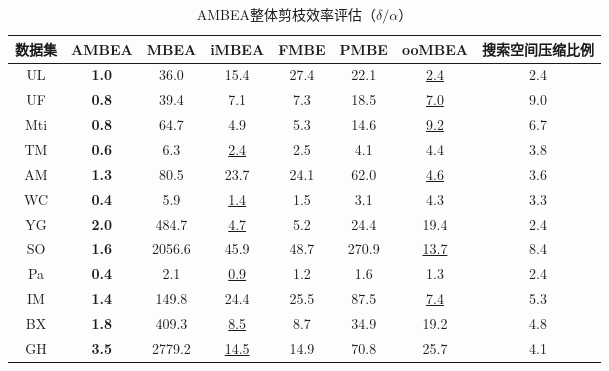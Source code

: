 \begin{table} [H]
	\centering    
	\setlength{\abovecaptionskip}{0cm}  
  \setlength{\belowcaptionskip}{-0.1cm}
	\caption{AMBEA整体剪枝效率评估（$\delta/\alpha$）}      
	\label{tbl:ambea_prune}
	\setlength{\tabcolsep}{5pt}
	\begin{center}
				\normalsize{
		\begin{tabular}{cccccccc}
			\hline 

      \textbf{数据集} & \textbf{AMBEA} & \textbf{MBEA} & \textbf{iMBEA} & \textbf{FMBE} & \textbf{PMBE} & \textbf{ooMBEA} & \textbf{搜索空间压缩比例} \\ \hline
      UL & \textbf{1.0} & 36.0 & 15.4 & 27.4 & 22.1 & \uline{2.4} & 2.4\\
      UF & \textbf{0.8} & 39.4 & 7.1 & 7.3 & 18.5 & \uline{7.0} & 9.0\\
      Mti & \textbf{0.8} & 64.7 & 4.9 & 5.3 & 14.6 & \uline{9.2} & 6.7\\
      TM & \textbf{0.6} & 6.3 & \uline{2.4} & 2.5 & 4.1 & 4.4 & 3.8\\
      AM & \textbf{1.3} & 80.5 & 23.7 & 24.1 & 62.0 & \uline{4.6} &3.6 \\
      WC & \textbf{0.4} & 5.9 & \uline{1.4} & 1.5 & 3.1 & 4.3 & 3.3\\
      YG & \textbf{2.0} & 484.7 & \uline{4.7} & 5.2 & 24.4 & 19.4 &2.4\\
      SO & \textbf{1.6} & 2056.6 & 45.9 & 48.7 & 270.9 & \uline{13.7} & 8.4\\
      Pa & \textbf{0.4} & 2.1 & \uline{0.9} & 1.2 & 1.6 & 1.3 &2.4\\
      IM & \textbf{1.4} & 149.8 & 24.4 & 25.5 & 87.5 & \uline{7.4} &5.3\\
      BX & \textbf{1.8} & 409.3 & \uline{8.5} & 8.7 & 34.9 & 19.2 &4.8\\
      GH & \textbf{3.5} & 2779.2 & \uline{14.5} & 14.9 & 70.8 & 25.7 &4.1\\ \hline
		\end{tabular}
				}
	\end{center}

\end{table}
